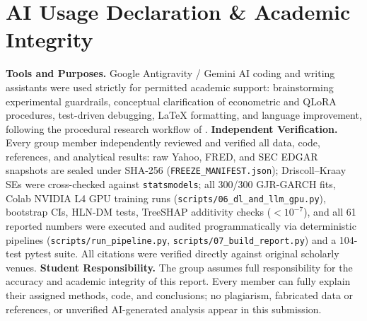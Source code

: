\documentclass[11pt,a4paper]{article}
\begin{document}
\section*{AI Usage Declaration \& Academic Integrity}
\textbf{Tools and Purposes.} Google Antigravity / Gemini AI coding and
writing assistants were used strictly for permitted academic support:
brainstorming experimental guardrails, conceptual clarification of econometric
and QLoRA procedures, test-driven debugging, LaTeX formatting, and language
improvement, following the procedural research workflow of
\citet{kassis2026skills}.
\textbf{Independent Verification.} Every group member independently reviewed
and verified all data, code, references, and analytical results: raw Yahoo,
FRED, and SEC EDGAR snapshots are sealed under SHA-256
(\texttt{FREEZE\_MANIFEST.json}); Driscoll--Kraay SEs were cross-checked
against \texttt{statsmodels}; all 300/300 GJR-GARCH fits, Colab NVIDIA L4 GPU
training runs (\texttt{scripts/06\_dl\_and\_llm\_gpu.py}), bootstrap CIs,
HLN-DM tests, TreeSHAP additivity checks ($< 10^{-7}$), and all 61 reported
numbers were executed and audited programmatically via deterministic pipelines
(\texttt{scripts/run\_pipeline.py},
\texttt{scripts/07\_build\_report.py}) and a 104-test pytest suite. All
citations were verified directly against original scholarly venues.
\textbf{Student Responsibility.} The group assumes full responsibility for
the accuracy and academic integrity of this report. Every member can fully
explain their assigned methods, code, and conclusions; no plagiarism,
fabricated data or references, or unverified AI-generated analysis appear in
this submission.
\end{document}
